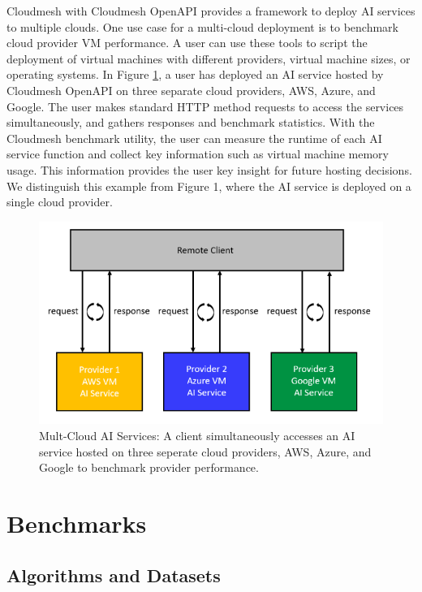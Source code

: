 Cloudmesh with Cloudmesh OpenAPI provides a framework to deploy AI
services to multiple clouds. One use case for a multi-cloud deployment
is to benchmark cloud provider VM performance. A user can use these
tools to script the deployment of virtual machines with different
providers, virtual machine sizes, or operating systems. In Figure \ref{fig:2}, a
user has deployed an AI service hosted by Cloudmesh OpenAPI on three
separate cloud providers, AWS, Azure, and Google. The user makes
standard HTTP method requests to access the services simultaneously, and
gathers responses and benchmark statistics. With the Cloudmesh benchmark
utility, the user can measure the runtime of each AI service function
and collect key information such as virtual machine memory usage. This
information provides the user key insight for future hosting decisions.
We distinguish this example from Figure 1, where the AI service is
deployed on a single cloud provider.

\begin{figure}
\centering
\includegraphics[width=\columnwidth]{../images/multi-cloud-ai-service.png}
\caption{Mult-Cloud AI Services: A client simultaneously accesses an AI service hosted
on three seperate cloud providers, AWS, Azure, and Google to benchmark
provider performance.}
\label{fig:2}
\end{figure}

\section{Benchmarks}\label{benchmarks}

\subsection{Algorithms and
Datasets}\label{algorithms-and-datasets}


